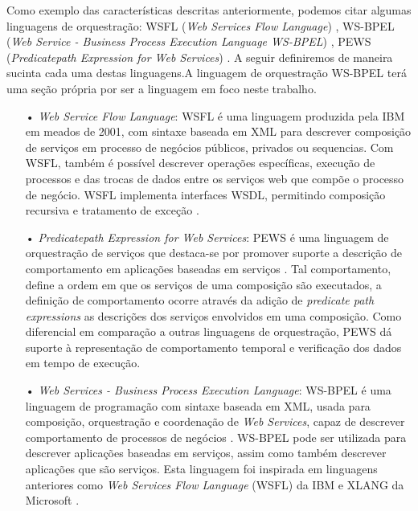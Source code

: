Como exemplo das características descritas anteriormente, podemos citar algumas linguagens de orquestração: WSFL (\textit{Web Services Flow Language}) \cite{Tsalgatidou}, WS-BPEL (\textit{Web Service - Business Process Execution Language WS-BPEL}) \cite{BPEL20}, PEWS (\textit{Predicatepath Expression for Web Services}) \cite{ba2005building}. A seguir definiremos de maneira sucinta cada uma destas linguagens.A linguagem de orquestração WS-BPEL terá uma seção própria por ser a linguagem em foco neste trabalho.

\begin{enumerate}

\item[•] \textit{Web Service Flow Language}: WSFL é uma linguagem produzida pela IBM em meados de 2001, com sintaxe baseada em XML para descrever composição de serviços em processo de negócios públicos, privados ou sequencias. Com WSFL, também é possível descrever operações específicas, execução de processos e das trocas de dados entre os serviços web que compõe o processo de negócio. WSFL implementa interfaces WSDL, permitindo composição recursiva e tratamento de exceção \cite{leymann01wsfl}.

\item[•] \textit{Predicatepath Expression for Web Services}: PEWS é uma linguagem de orquestração de serviços que destaca-se por promover suporte a descrição de comportamento em aplicações baseadas em serviços \cite{Cheikh}. Tal comportamento, define a ordem em que os serviços de uma composição são executados, a definição de comportamento ocorre através da adição de \textit{predicate path expressions} as descrições dos serviços envolvidos em uma composição. Como diferencial em comparação a outras linguagens de orquestração, PEWS dá suporte à representação de comportamento temporal e verificação dos dados em tempo de execução. 

\item[•] \textit{Web Services - Business Process Execution Language}: WS-BPEL é uma linguagem de programação com sintaxe baseada em XML, usada para composição, orquestração e coordenação de \textit{Web Services}, capaz de descrever comportamento de processos de negócios \cite{BPEL20}. WS-BPEL pode ser utilizada para descrever aplicações baseadas em serviços, assim como também descrever aplicações que são serviços. Esta linguagem foi inspirada em linguagens anteriores como \textit{Web Services Flow Language} (WSFL) da IBM e XLANG da Microsoft \cite{BPEL20}.

\end{enumerate}

